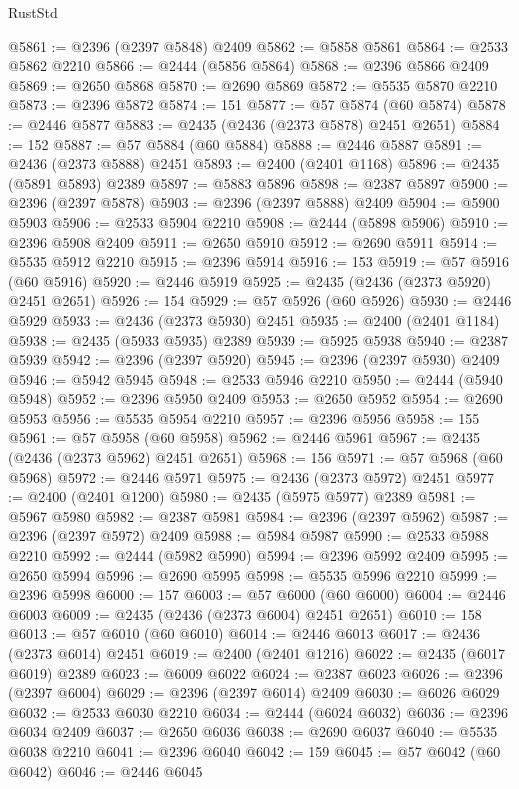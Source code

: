 \begin{lexlean}{RustStd}
\begin{coremodule}
@5861 := @2396 (@2397 @5848) @2409
@5862 := @5858 @5861
@5864 := @2533 @5862 @2210
@5866 := @2444 (@5856 @5864)
@5868 := @2396 @5866 @2409
@5869 := @2650 @5868
@5870 := @2690 @5869
@5872 := @5535 @5870 @2210
@5873 := @2396 @5872
@5874 := 151
@5877 := @57 @5874 (@60 @5874)
@5878 := @2446 @5877
@5883 := @2435 (@2436 (@2373 @5878) @2451 @2651)
@5884 := 152
@5887 := @57 @5884 (@60 @5884)
@5888 := @2446 @5887
@5891 := @2436 (@2373 @5888) @2451
@5893 := @2400 (@2401 @1168)
@5896 := @2435 (@5891 @5893) @2389
@5897 := @5883 @5896
@5898 := @2387 @5897
@5900 := @2396 (@2397 @5878)
@5903 := @2396 (@2397 @5888) @2409
@5904 := @5900 @5903
@5906 := @2533 @5904 @2210
@5908 := @2444 (@5898 @5906)
@5910 := @2396 @5908 @2409
@5911 := @2650 @5910
@5912 := @2690 @5911
@5914 := @5535 @5912 @2210
@5915 := @2396 @5914
@5916 := 153
@5919 := @57 @5916 (@60 @5916)
@5920 := @2446 @5919
@5925 := @2435 (@2436 (@2373 @5920) @2451 @2651)
@5926 := 154
@5929 := @57 @5926 (@60 @5926)
@5930 := @2446 @5929
@5933 := @2436 (@2373 @5930) @2451
@5935 := @2400 (@2401 @1184)
@5938 := @2435 (@5933 @5935) @2389
@5939 := @5925 @5938
@5940 := @2387 @5939
@5942 := @2396 (@2397 @5920)
@5945 := @2396 (@2397 @5930) @2409
@5946 := @5942 @5945
@5948 := @2533 @5946 @2210
@5950 := @2444 (@5940 @5948)
@5952 := @2396 @5950 @2409
@5953 := @2650 @5952
@5954 := @2690 @5953
@5956 := @5535 @5954 @2210
@5957 := @2396 @5956
@5958 := 155
@5961 := @57 @5958 (@60 @5958)
@5962 := @2446 @5961
@5967 := @2435 (@2436 (@2373 @5962) @2451 @2651)
@5968 := 156
@5971 := @57 @5968 (@60 @5968)
@5972 := @2446 @5971
@5975 := @2436 (@2373 @5972) @2451
@5977 := @2400 (@2401 @1200)
@5980 := @2435 (@5975 @5977) @2389
@5981 := @5967 @5980
@5982 := @2387 @5981
@5984 := @2396 (@2397 @5962)
@5987 := @2396 (@2397 @5972) @2409
@5988 := @5984 @5987
@5990 := @2533 @5988 @2210
@5992 := @2444 (@5982 @5990)
@5994 := @2396 @5992 @2409
@5995 := @2650 @5994
@5996 := @2690 @5995
@5998 := @5535 @5996 @2210
@5999 := @2396 @5998
@6000 := 157
@6003 := @57 @6000 (@60 @6000)
@6004 := @2446 @6003
@6009 := @2435 (@2436 (@2373 @6004) @2451 @2651)
@6010 := 158
@6013 := @57 @6010 (@60 @6010)
@6014 := @2446 @6013
@6017 := @2436 (@2373 @6014) @2451
@6019 := @2400 (@2401 @1216)
@6022 := @2435 (@6017 @6019) @2389
@6023 := @6009 @6022
@6024 := @2387 @6023
@6026 := @2396 (@2397 @6004)
@6029 := @2396 (@2397 @6014) @2409
@6030 := @6026 @6029
@6032 := @2533 @6030 @2210
@6034 := @2444 (@6024 @6032)
@6036 := @2396 @6034 @2409
@6037 := @2650 @6036
@6038 := @2690 @6037
@6040 := @5535 @6038 @2210
@6041 := @2396 @6040
@6042 := 159
@6045 := @57 @6042 (@60 @6042)
@6046 := @2446 @6045

\end{coremodule}
\end{lexlean}
